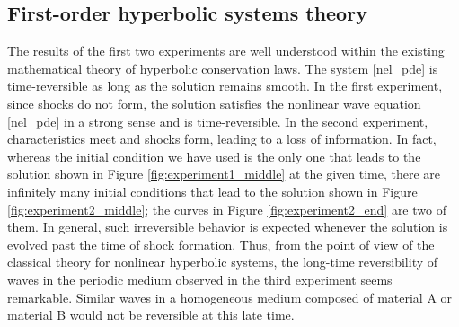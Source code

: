 \subsection{First-order hyperbolic systems theory}
The results of the first two experiments are well understood within the existing
mathematical theory of hyperbolic conservation laws.  The system \eqref{nel_pde}
is time-reversible as long as the solution remains smooth.
In the first experiment, since shocks do not form,
the solution satisfies the nonlinear wave equation \eqref{nel_pde} 
in a strong sense and is time-reversible.
In the second experiment, characteristics meet and shocks form, leading to
a loss of information.  In fact, whereas the initial condition we have used
is the only one
that leads to the solution shown in Figure \ref{fig:experiment1_middle}
at the given time, there are infinitely many initial conditions that lead
to the solution shown in Figure \ref{fig:experiment2_middle}; the 
curves in Figure \ref{fig:experiment2_end} are two of them.
In general, such irreversible behavior is
expected whenever the solution is evolved past the time of shock formation.
Thus, from the point of view of the classical theory for nonlinear hyperbolic
systems, the long-time reversibility of waves in the periodic
medium observed in the third experiment seems remarkable.
Similar waves in a homogeneous medium composed of material A
or material B would not be reversible at this late time. 


